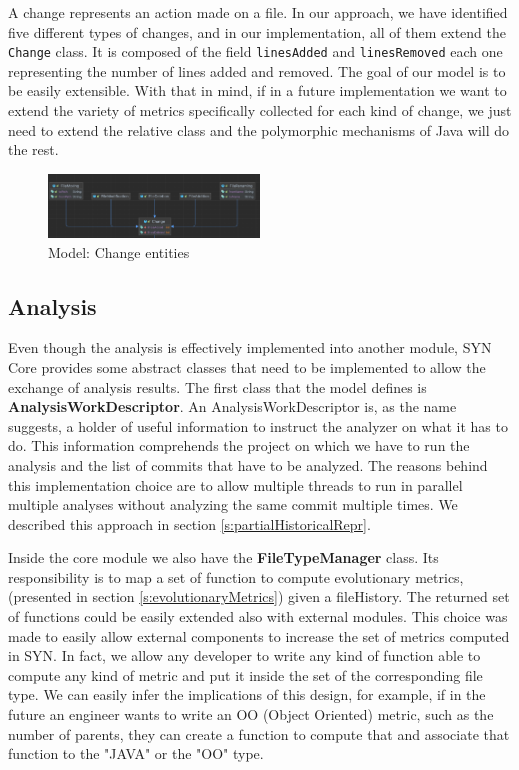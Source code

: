 A change represents an action made on a file. In our approach, we have identified five different types of changes, and in our implementation, all of them extend the \texttt{Change} class. It is composed of the field \texttt{linesAdded} and \texttt{linesRemoved} each one representing the number of lines added and removed. 
The goal of our model is to be easily extensible. With that in mind, if in a future implementation we want to extend the variety of metrics specifically collected for each kind of change, we just need to extend the relative class and the polymorphic mechanisms of Java will do the rest. 

\begin{figure}
    \center
    \includegraphics[width=0.5\textwidth]{UMLChanges.png}
    \caption{Model: Change entities}
    \label{fig:modelChange}
\end{figure}


\subsection*{Analysis}
Even though the analysis is effectively implemented into another module, SYN Core provides some abstract classes that need to be implemented to allow the exchange of analysis results. 
The first class that the model defines is \textbf{AnalysisWorkDescriptor}.
An AnalysisWorkDescriptor is, as the name suggests, a holder of useful information to instruct the analyzer on what it has to do. This information comprehends the project on which we have to run the analysis and the list of commits that have to be analyzed. 
The reasons behind this implementation choice are to allow multiple threads to run in parallel multiple analyses without analyzing the same commit multiple times. 
We described this approach in section \ref{s:partialHistoricalRepr}.
\bigbreak

Inside the core module we also have the \textbf{FileTypeManager} class. Its responsibility is to map a set of function to compute evolutionary metrics, (presented in section \ref{s:evolutionaryMetrics}) given a fileHistory. The returned set of functions could be easily extended also with external modules. This choice was made to easily allow external components to increase the set of metrics computed in SYN. In fact, we allow any developer to write any kind of function able to compute any kind of metric and put it inside the set of the corresponding file type. 
We can easily infer the implications of this design, for example, if in the future an engineer wants to write an OO (Object Oriented) metric, such as the number of parents, they can create a function to compute that and associate that function to the "JAVA" or the "OO" type. 
\bigbreak

